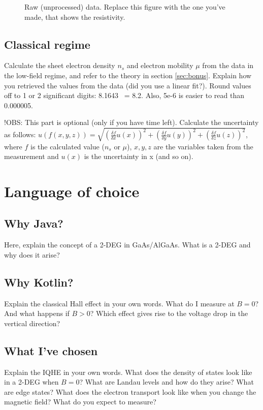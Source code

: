\documentclass[a4paper]{article}
\begin{document}
\begin{figure}
	\centering
	\caption{\label{fig:data}Raw (unprocessed) data. Replace this figure with the one you've made, that shows the resistivity.}
\end{figure}

\subsection{Classical regime}
Calculate the sheet electron density $n_{s}$ and electron mobility $\mu$ from the data in the low-field regime, and refer to the theory in section \ref{sec:bonus}. Explain how you retrieved the values from the data (did you use a linear fit?).
Round values off to 1 or 2 significant digits: 8.1643 ~= 8.2. Also, 5e-6 is easier to read than 0.000005.

!OBS: This part is optional (only if you have time left).
Calculate the uncertainty as follows: \newline $u(f(x, y, z)) = \sqrt{(\frac{\delta f}{\delta{x}} u(x))^{2} + (\frac{\delta f}{\delta{y}} u(y))^{2} + (\frac{\delta f}{\delta{z}} u(z))^{2}}$, where $f$ is the calculated value ($n_{s}$ or $\mu$), $x, y, z$ are the variables taken from the measurement and $u(x)$ is the uncertainty in x (and so on).

\section{Language of choice}
\label{sec:language}

\subsection{Why Java?}
Here, explain the concept of a 2-DEG in GaAs/AlGaAs. What is a 2-DEG and why does it arise?

\subsection{Why Kotlin?}
Explain the classical Hall effect in your own words. What do I measure at $B=0$? And what happens if $B>0$? Which effect gives rise to the voltage drop in the vertical direction?

\subsection{What I've chosen}
Explain the IQHE in your own words. What does the density of states look like in a 2-DEG when $B=0$? What are Landau levels and how do they arise? What are edge states? What does the electron transport look like when you change the magnetic field? What do you expect to measure?
\end{document}
